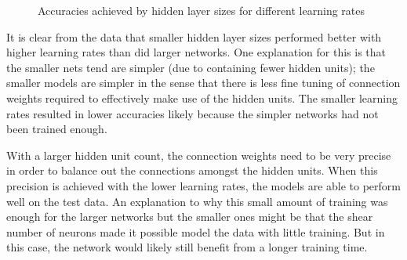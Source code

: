 \documentclass[a4paper]{article}
\begin{document}
\begin{figure}[h]
\label{figure}
\centering
{} 
\caption{Accuracies achieved by hidden layer sizes for different learning rates}
\label{english-frequency}
\end{figure}

It is clear from the data that smaller hidden layer sizes performed
better with higher learning rates than did larger networks. One
explanation for this is that the smaller nets tend are simpler
(due to containing fewer hidden units); the smaller models are simpler
in the sense that there is less fine tuning of connection weights
required to effectively make use of the hidden units.
The smaller learning rates resulted in lower accuracies likely
because the simpler networks had not been trained enough.

With a larger hidden unit count, the connection weights need to be
very precise in order to balance out the connections amongst the
hidden units. When this precision is achieved with the lower
learning rates, the models are able to perform well on the test
data. An explanation to why this small amount of training was
enough for the larger networks but the smaller ones might be that
the shear number of neurons made it possible model the data with
little training. But in this case, the network would likely still 
benefit from a longer training time.
\end{document}
